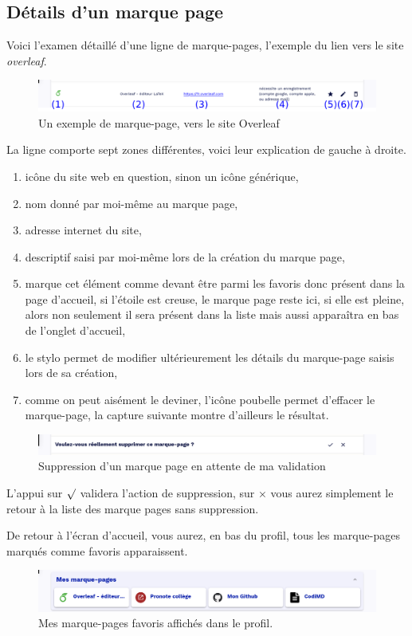 \subsection{Détails d'un marque page} \label{subsec-detail-bookmark}
Voici l'examen détaillé d'une ligne de marque-pages, l'exemple du lien vers le site \emph{overleaf}.
\begin{figure}
	\centering
	\includegraphics{./Captures/portail.marque.pages.exemple.png}
	\caption{Un exemple de marque-page, vers le site Overleaf}
\end{figure}
La ligne comporte sept zones différentes, voici leur explication de gauche à droite.
\begin{enumerate}
	\item icône du site web en question, sinon un icône générique,
	\item nom donné par moi-même au marque page,
	\item adresse internet du site,
	\item descriptif saisi par moi-même lors de la création du marque page,
	\item marque cet élément comme devant être parmi les favoris donc présent dans la page d'accueil, si l'étoile est creuse, le marque page reste ici, si elle est pleine, alors non seulement il sera présent dans la liste mais aussi apparaîtra en bas de l'onglet d'accueil,
	\item le stylo permet de modifier ultérieurement les détails du marque-page saisis lors de sa création,
	\item comme on peut aisément le deviner, l'icône poubelle permet d'effacer le marque-page, la capture suivante montre d'ailleurs le résultat.
\end{enumerate}
\begin{figure}
	\centering
	\includegraphics{./Captures/portail.marque.pages.suppression.png}
	\caption{Suppression d'un marque page en attente de ma validation}
\end{figure}
L'appui sur $\surd$ validera l'action de suppression, sur $\times$ vous aurez simplement le retour à la liste des marque pages sans suppression.

De retour à l'écran d'accueil, vous aurez, en bas du profil, tous les marque-pages marqués comme favoris apparaissent.
\begin{figure}
	\centering
	\includegraphics{./Captures/portail.accueil.mes.favoris.png}
	\caption{Mes marque-pages favoris affichés dans le profil.}
\end{figure}

